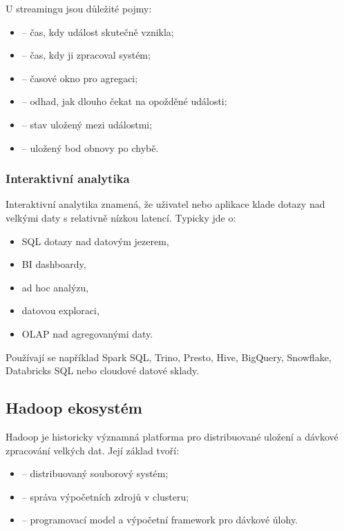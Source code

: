 U streamingu jsou důležité pojmy:
\begin{itemize}
    \item {} -- čas, kdy událost skutečně vznikla;
    \item {} -- čas, kdy ji zpracoval systém;
    \item {} -- časové okno pro agregaci;
    \item {} -- odhad, jak dlouho čekat na opožděné události;
    \item {} -- stav uložený mezi událostmi;
    \item {} -- uložený bod obnovy po chybě.
\end{itemize}

\subsubsection{Interaktivní analytika}

Interaktivní analytika znamená, že uživatel nebo aplikace klade dotazy nad velkými daty s relativně
nízkou latencí. Typicky jde o:
\begin{itemize}
    \item SQL dotazy nad datovým jezerem,
    \item BI dashboardy,
    \item ad hoc analýzu,
    \item datovou exploraci,
    \item OLAP nad agregovanými daty.
\end{itemize}

Používají se například Spark SQL, Trino, Presto, Hive, BigQuery, Snowflake, Databricks SQL nebo cloudové
datové sklady.

\subsection{Hadoop ekosystém}

Hadoop je historicky významná platforma pro distribuované uložení a dávkové zpracování velkých dat.
Její základ tvoří:
\begin{itemize}
    \item {} -- distribuovaný souborový systém;
    \item {} -- správa výpočetních zdrojů v clusteru;
    \item {} -- programovací model a výpočetní framework pro dávkové úlohy.
\end{itemize}

